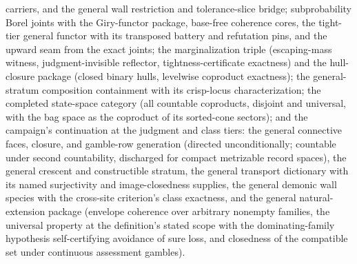 \begin{itemize}
  carriers, and the general wall restriction and tolerance-slice
  bridge; subprobability Borel joints with the Giry-functor
  package, base-free coherence cores, the tight-tier general
  functor with its transposed battery and refutation pins, and the
  upward seam from the exact joints; the marginalization triple
  (escaping-mass witness, judgment-invisible reflector,
  tightness-certificate exactness) and the hull-closure package
  (closed binary hulls, levelwise coproduct exactness); the
  general-stratum composition containment with its crisp-locus
  characterization; the completed state-space category (all
  countable coproducts, disjoint and universal, with the bag space
  as the coproduct of its sorted-cone sectors); and the campaign's
  continuation at the judgment and class tiers: the general
  connective faces, closure, and gamble-row generation (directed
  unconditionally; countable under second countability, discharged
  for compact metrizable record spaces), the general crescent and
  constructible stratum, the general transport dictionary with its
  named surjectivity and image-closedness supplies, the general
  demonic wall species with the cross-site criterion's class
  exactness, and the general natural-extension package (envelope
  coherence over arbitrary nonempty families, the universal
  property at the definition's stated scope with the
  dominating-family hypothesis self-certifying avoidance of sure
  loss, and closedness of the compatible set under continuous
  assessment gambles).
\end{itemize}

